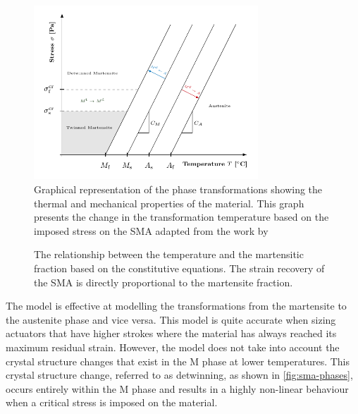 \begin{figure}[hbt]
    \centering
    \includegraphics[width=0.75\textwidth]{images/chap2/phase-diagram-graph.pdf}
    \caption{Graphical representation of the phase transformations showing the thermal and mechanical properties of the material. This graph presents the change in the transformation temperature based on the imposed stress on the SMA adapted from the work by \cite{ricciardiChapterExperimentalCharacterization2021}}
    \label{fig:phase-diagram-graph}
\end{figure}

\begin{figure}[hbt]
    \centering
    \resizebox{0.75\textwidth}{!}{}
    \caption{The relationship between the temperature and the martensitic fraction based on the \cite{brinsonOneDimensionalConstitutiveBehavior1993} constitutive equations. The strain recovery of the SMA is directly proportional to the martensite fraction.}
    \label{fig:sma-temperature-transformation-model}
\end{figure}

The \cite{liangConstitutiveModelingShape1990a} model is effective at modelling the transformations from the martensite to the austenite phase and vice versa. This model is quite accurate when sizing actuators that have higher strokes where the material has always reached its maximum residual strain. However, the model does not take into account the crystal structure changes that exist in the M phase at lower temperatures. This crystal structure change, referred to as detwinning, as shown in \cref{fig:sma-phases}, occurs entirely within the M phase and results in a highly non-linear behaviour when a critical stress is imposed on the material.

